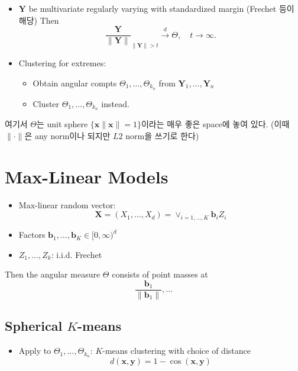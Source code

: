 \documentclass[
  letterpaper,
  DIV=11,
  numbers=noendperiod]{scrreprt}
\providecommand{\tightlist}{%
  \setlength{\itemsep}{0pt}\setlength{\parskip}{0pt}}\usepackage{longtable,booktabs,array}
\theoremstyle{plain}
\theoremstyle{definition}
\theoremstyle{definition}
\theoremstyle{plain}
\theoremstyle{plain}
\theoremstyle{remark}
\begin{document}
\begin{itemize}
\item
  \(\pmb{Y}\) be multivariate regularly varying with standardized margin
  (Frechet 등이 해당) Then \[
  \frac{\pmb{Y}}{\|\pmb{Y}\|}_{\| \pmb{Y}\|>t}\stackrel{d}{\rightarrow} \Theta, \quad{} t \rightarrow \infty.
  \]
\item
  Clustering for extremes:

  \begin{itemize}
  \tightlist
  \item
    Obtain angular compts \(\Theta_1, \ldots, \Theta_{k_n}\) from
    \(\pmb{Y}_1, \ldots , \pmb{Y}_n\)
  \item
    Cluster \(\Theta_1, \ldots, \Theta_{k_n}\) instead.
  \end{itemize}
\end{itemize}

여기서 \(\Theta\)는 unit sphere \(\{ \pmb{x} \| \pmb{x} \| = 1\}\)이라는
매우 좋은 space에 놓여 있다. (이때 \(\| \cdot \|\)은 any norm이나 되지만
\(L2\) norm을 쓰기로 한다)

\section{Max-Linear Models}\label{max-linear-models}

\begin{itemize}
\item
  Max-linear random vector: \[
  \pmb{X} = (X_1, \ldots, X_d) = \vee_{i=1, \ldots, K}\pmb{b}_i Z_i
  \]
\item
  Factors \(\pmb{b}_1, \ldots, \pmb{b}_{K} \in [ 0, \infty )^{d}\)
\item
  \(Z_1, \ldots, Z_k\): i.i.d. Frechet
\end{itemize}

Then the angular measure \(\Theta\) consists of point masses at \[
\frac{\pmb{b}_1}{\|\pmb{b}_1\|}, \ldots
\]

\subsection{\texorpdfstring{Spherical
\(K\)-means}{Spherical K-means}}\label{spherical-k-means}

\begin{itemize}
\tightlist
\item
  Apply to \(\Theta_1, \ldots, \Theta_{k_n}\): \(K\)-means clustering
  with choice of distance \[
  d(\pmb{x}, \pmb{y}) = 1- \cos (\pmb{x}, \pmb{y})
  \]
\end{itemize}
\end{document}
